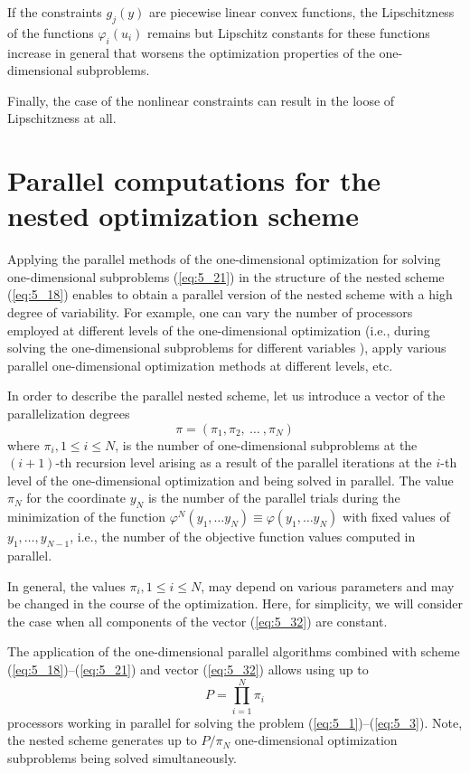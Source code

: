 If the constraints $g_j(y)$   are piecewise linear convex functions, the Lipschitzness of the functions $\varphi_i(u_i)$  remains but Lipschitz constants for these functions increase in general that worsens the optimization properties of the one-dimensional subproblems.

Finally, the case of the nonlinear constraints can result in the loose of Lipschitzness at all.
\section{Parallel computations for the nested optimization scheme}
\label{sec:5_3}
Applying the parallel methods of the one-dimensional optimization for solving one-dimensional subproblems (\ref{eq:5_21}) in the structure of the nested scheme (\ref{eq:5_18}) enables to obtain a parallel version of the nested scheme with a high degree of variability. For example, one can vary the number of processors employed at different levels of the one-dimensional optimization (i.e., during solving the one-dimensional subproblems for different variables ), apply various parallel one-dimensional optimization methods at different levels, etc.

In order to describe the parallel nested scheme, let us introduce a vector of the parallelization degrees
\begin{equation}
\label{eq:5_32}
\pi=(\pi_1,\pi_2,\:\ldots\:,\pi_N)
\end{equation}
where $\pi_i,1\leq i\leq N$, is the number of one-dimensional subproblems at the $(i+1)$-th recursion level arising as a result of the parallel iterations at the $i$-th level of the one-dimensional optimization and being solved in parallel. The value $\pi_N$  for the coordinate $y_N$  is the number of the parallel trials during the minimization of the function $\varphi^N(y_1,\ldots y_N)\equiv  \varphi(y_1,\ldots y_N)$ with fixed values of $y_1,\ldots, y_{N-1}$, i.e., the number of the objective function values computed in parallel. 

In general, the values $\pi_i,1\leq i\leq N$, may depend on various parameters and may be changed in the course of the optimization. Here, for simplicity, we will consider the case when all components of the vector (\ref{eq:5_32}) are constant. 

The application of the one-dimensional parallel algorithms combined with scheme (\ref{eq:5_18})--(\ref{eq:5_21}) and vector (\ref{eq:5_32}) allows using up to
\begin{displaymath}
P=\prod_{i=1}^N{\pi_i}
\end{displaymath}
processors working in parallel for solving the problem (\ref{eq:5_1})--(\ref{eq:5_3}). Note, the nested scheme generates up to $P/\pi_N$  one-dimensional optimization subproblems being solved simultaneously.

